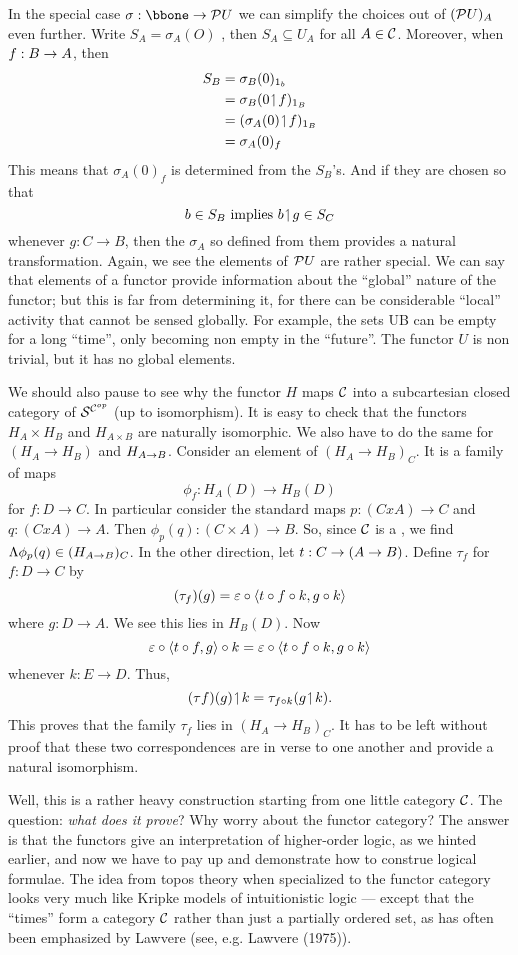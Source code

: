 In the special case $\sigma :\bbone \to \PU$ we can simplify the choices
out of $(\mathcal P U)_A$ even further. Write $S_A= \sigma_A(O)$ , then $S_A\subseteq U_A$ for all $A \in \mathcal C$. Moreover, when $f: B \rightarrow A$, then
\begin{align*}
S_B &= \sigma_B(0)_{{\mathrm 1}_b}\\
&= \sigma_B(0 \!\upharpoonleft\! f)_{{\mathrm 1} _B}\\
&= (\sigma_A(0) \!\upharpoonleft\! f)_{{\mathrm 1} _B}\\
&= \sigma_A(0)_f
\end{align*}
This means that $\sigma_A(0)_f$ is determined from the $S_B$'s. And if they are chosen so that
$$
b \in S_B {\textrm{ implies }} b \!\upharpoonleft\! g \in S_C
$$
whenever $g: C\to B$, then the $\sigma_A$ so defined from them provides a
natural transformation. Again, we see the elements of $\mathcal P U$ are rather special. We can say that elements of a functor provide
information about the ``global'' nature of the functor; but this is far from determining it, for there can be considerable ``local'' activity that cannot be sensed globally. For example, the sets UB can be empty for a long ``time'', only becoming non empty in the ``future''. The functor $U$ is non trivial, but it has no global elements.

We should also pause to see why the functor $H$ maps $\mathcal C$ into a
subcartesian closed category of $\mathcal S^{\mathcal C^{op}}$ (up to isomorphism). It
is easy to check that the functors $H_A \times H_B$ and $H_{A \times B}$ are naturally isomorphic. We also have to do the same for $(H_A \to H_B)$ and $H_{A \rightarrow B}$. Consider an element of $(H_A\to H_B)_C$. It is a family of maps
$$
\phi_f : H_A(D) \to H_B(D)
$$
for $f: D\to C$. In particular consider the standard maps
$p: (C x A) \to C$ and $q : (C x A)\to A$.
Then $\phi_p(q) : (C \times A)\to B$.
So, since $\mathcal C$ is a \ccc, we find $\Lambda\phi_p(q) \in (H_{A \rightarrow B})_C$. In the
other direction, let $t : C\rightarrow (A \rightarrow B)$.
Define $\tau_f$ for $f : D\to C$ by
$$
(\tau_f)(g) = \varepsilon \circ \langle t \circ f \circ k, g \circ k \rangle
$$
where $g : D \to A$. We see this lies in $H_B(D)$. Now
$$
\varepsilon \circ \langle t \circ f, g\rangle \circ k = \varepsilon \circ \langle t \circ f \circ k, g \circ k\rangle
$$
whenever $k: E \to D$. Thus,
$$
(\tau f)(g) \!\upharpoonleft\! k = \tau_{f \circ k}(g \!\upharpoonleft\! k).
$$
This proves that the family $\tau_f$ lies in $(H_A \to H_B)_C$. It has to be left without proof that these two correspondences are in verse to one another and provide a natural isomorphism.

Well, this is a rather heavy construction starting from one little category $\mathcal C$. The question: {\it what does it prove}? Why worry about the functor category? The answer is that the functors give an interpretation of higher-order logic, as we hinted earlier, and now we have to pay up and demonstrate
how to construe logical formulae. The idea from topos theory when specialized to the functor category looks very much like Kripke models of intuitionistic logic --- except that the ``times'' form a category $\mathcal C$ rather than just a partially ordered set, as has often been emphasized by Lawvere (see, e.g. Lawvere (1975)).

